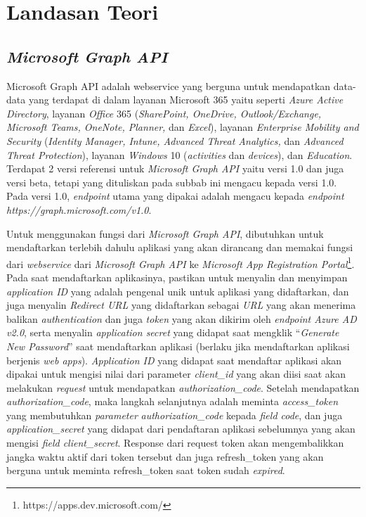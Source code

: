 \chapter{Landasan Teori}
\label{chap:teori}

\section{\textit{Microsoft Graph API}}
\label{sec:microsoftgraph}
Microsoft Graph API adalah webservice yang berguna untuk mendapatkan data-data yang terdapat di dalam layanan Microsoft 365 yaitu seperti \textit{Azure Active Directory}, layanan \textit{Office} 365 (\textit{SharePoint, OneDrive, Outlook/Exchange, Microsoft Teams, OneNote, Planner,} dan \textit{Excel}), layanan \textit{Enterprise Mobility and Security} (\textit{Identity Manager, Intune, Advanced Threat Analytics,} dan \textit{Advanced Threat Protection}), layanan \textit{Windows} 10 (\textit{activities} dan \textit{devices}), dan \textit{Education}. Terdapat 2 versi referensi untuk \textit{Microsoft Graph API} yaitu versi 1.0 dan juga versi beta, tetapi yang dituliskan pada subbab ini mengacu kepada versi 1.0. Pada versi 1.0, \textit{endpoint} utama yang dipakai adalah mengacu kepada \textit{endpoint} \textit{https://graph.microsoft.com/v1.0}. 

Untuk menggunakan fungsi dari \textit{Microsoft Graph API}, dibutuhkan untuk mendaftarkan terlebih dahulu aplikasi yang akan dirancang dan memakai fungsi dari \textit{webservice} dari \textit{Microsoft Graph API} ke \textit{Microsoft App Registration Portal}\footnote{https://apps.dev.microsoft.com/}. Pada saat mendaftarkan aplikasinya, pastikan untuk menyalin dan menyimpan \textit{application ID} yang adalah pengenal unik untuk aplikasi yang didaftarkan, dan juga menyalin \textit{Redirect URL} yang didaftarkan sebagai \textit{URL} yang akan menerima balikan \textit{authentication} dan juga \textit{token} yang akan dikirim oleh \textit{endpoint Azure AD v2.0}, serta menyalin \textit{application secret} yang didapat saat mengklik ``\textit{Generate New Password}'' saat mendaftarkan aplikasi (berlaku jika mendaftarkan aplikasi berjenis \textit{web apps}). \textit{Application ID} yang didapat saat mendaftar aplikasi akan dipakai untuk mengisi nilai dari parameter \textit{client\_id} yang akan diisi saat akan melakukan \textit{request} untuk mendapatkan \textit{authorization\_code}. Setelah mendapatkan \textit{authorization\_code}, maka langkah selanjutnya adalah meminta \textit{access\_token} yang membutuhkan \textit{parameter} \textit{authorization\_code} kepada \textit{field code}, dan juga \textit{application\_secret} yang didapat dari pendaftaran aplikasi sebelumnya yang akan mengisi \textit{field client\_secret}. Response dari request token akan mengembalikkan jangka waktu aktif dari token tersebut dan juga refresh\_token yang akan berguna untuk meminta refresh\_token saat token sudah \textit{expired}.


